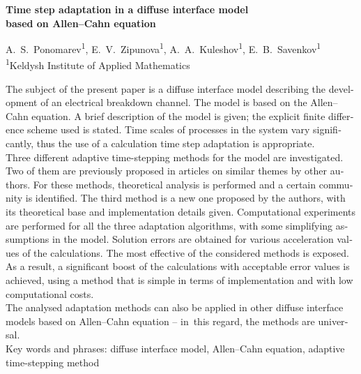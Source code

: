 \documentclass[a4paper,12pt]{article}
\theoremstyle{plain}
\theoremstyle{remark}
\newcommand{\PreprintTitleEnglish}{%
	Time step adaptation in a diffuse interface model \\ based on Allen--Cahn equation%
}
\newcommand{\PreprintAuthorsEnglish}{%
	A.~S.~Ponomarev\textsuperscript{1}, E.~V.~Zipunova\textsuperscript{1}, A.~A.~Kuleshov\textsuperscript{1}, E.~B.~Savenkov\textsuperscript{1} \\
	\textsuperscript{1}Keldysh Institute of Applied Mathematics%
}
\begin{document}
\begin{otherlanguage}{english}
{
	\centering
	{\large \textbf{\PreprintTitleEnglish} \par}
	\vspace{1mm}
	\PreprintAuthorsEnglish \par
	\vspace{1mm}
}
{
	\noindent \small
	The subject of the present paper is a diffuse interface model describing the development of an electrical breakdown channel. The model is based on the Allen--Cahn equation. A brief description of the model is given; the explicit finite difference scheme used is stated. Time scales of processes in the system vary significantly, thus the use of a calculation time step adaptation is appropriate. \\
	Three different adaptive time-stepping methods for the model are investigated. Two of them are previously proposed in articles on similar themes by other authors. For these methods, theoretical analysis is performed and a certain community is identified. The third method is a new one proposed by the authors, with its theoretical base and implementation details given. Computational experiments are performed for all the three adaptation algorithms, with some simplifying assumptions in the model. Solution errors are obtained for various acceleration values of the calculations. The most effective of the considered methods is exposed. As a result, a significant boost of the calculations with acceptable error values is achieved, using a method that is simple in terms of implementation and with low computational costs. \\
	The analysed adaptation methods can also be applied in other diffuse interface models based on Allen--Cahn equation -- in~this regard, the methods are universal. \\[2mm]
	Key words and phrases: diffuse interface model, Allen--Cahn equation, adaptive time-stepping method \par
	\vspace{2mm}
}
\end{otherlanguage}
















\clearpage
\printbibliography[
	heading=bibintoc
]

\clearpage
\tableofcontents
\end{document}

